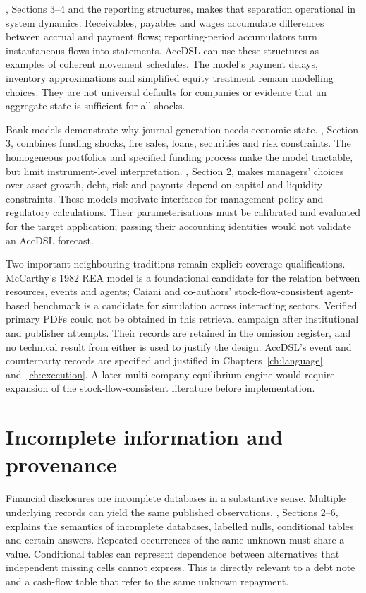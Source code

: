 \citet{pierson2020}, Sections 3--4 and the reporting structures, makes that
separation operational in system dynamics. Receivables, payables and wages
accumulate differences between accrual and payment flows; reporting-period
accumulators turn instantaneous flows into statements. AccDSL can use these
structures as examples of coherent movement schedules. The model's payment
delays, inventory approximations and simplified equity treatment remain
modelling choices. They are not universal defaults for companies or evidence
that an aggregate state is sufficient for all shocks.

Bank models demonstrate why journal generation needs economic state.
\citet{halaj2016}, Section 3, combines funding shocks, fire sales, loans,
securities and risk constraints. The homogeneous portfolios and specified
funding process make the model tractable, but limit instrument-level
interpretation. \citet{behn2019}, Section 2, makes managers' choices over asset
growth, debt, risk and payouts depend on capital and liquidity constraints.
These models motivate interfaces for management policy and regulatory
calculations. Their parameterisations must be calibrated and evaluated for
the target application; passing their accounting identities would not validate
an AccDSL forecast.

Two important neighbouring traditions remain explicit coverage qualifications.
McCarthy's 1982 REA model is a foundational candidate for the relation between
resources, events and agents; Caiani and co-authors' stock-flow-consistent
agent-based benchmark is a candidate for simulation across interacting sectors.
Verified primary PDFs could not be obtained in this retrieval campaign after
institutional and publisher attempts. Their records are retained in the omission
register, and no technical result from either is used to justify the design.
AccDSL's event and counterparty records are specified and justified in Chapters~\ref{ch:language} and~\ref{ch:execution}. A later multi-company equilibrium engine would require expansion of
the stock-flow-consistent literature before implementation.

\section{Incomplete information and provenance}

Financial disclosures are incomplete databases in a substantive sense.
Multiple underlying records can yield the same published observations.
\citet{libkin2014}, Sections 2--6, explains the semantics of incomplete
databases, labelled nulls, conditional tables and certain answers. Repeated
occurrences of the same unknown must share a value. Conditional tables can
represent dependence between alternatives that independent missing cells
cannot express. This is directly relevant to a debt note and a cash-flow table
that refer to the same unknown repayment.

